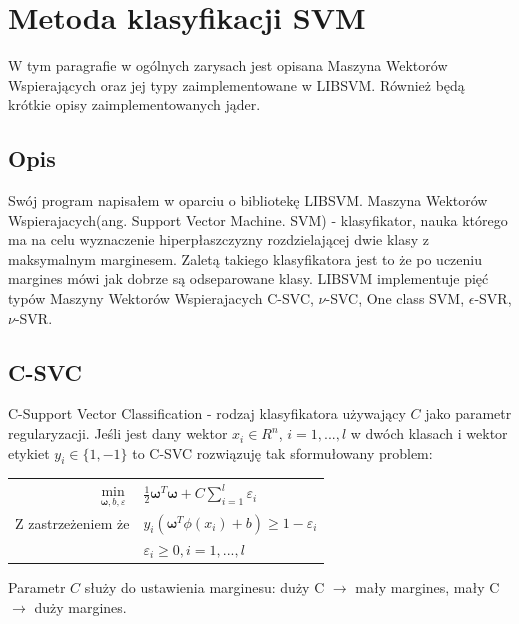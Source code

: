 \documentclass[paper=a4, fontsize=11pt]{scrartcl} %
\numberwithin{equation}{section} %
\numberwithin{figure}{section} %
\begin{document}
\section{Metoda klasyfikacji SVM} %
    \par W tym paragrafie w ogólnych zarysach jest opisana Maszyna Wektorów Wspierających
    oraz jej typy zaimplementowane w LIBSVM. Również będą krótkie opisy zaimplementowanych
    jąder.
\subsection{Opis}
    \par Swój program napisałem w oparciu o bibliotekę LIBSVM\cite{CC01a}. Maszyna Wektorów
    Wspierajacych(ang. Support Vector Machine. SVM) - klasyfikator, nauka którego ma na celu 
    wyznaczenie hiperpłaszczyzny rozdzielającej dwie klasy z maksymalnym marginesem. 
    Zaletą takiego klasyfikatora jest to że po uczeniu margines mówi jak dobrze są 
    odseparowane klasy. LIBSVM implementuje pięć typów Maszyny Wektorów Wspierajacych C-SVC, 
    $\nu$-SVC, One class SVM, $\epsilon$-SVR, $\nu$-SVR.
\subsection{C-SVC}
    \par C-Support Vector Classification - rodzaj klasyfikatora używający $C$ jako 
    parametr regularyzacji. Jeśli jest dany wektor $x_i \in R^n$, $i=1,...,l$ 
    w dwóch klasach i wektor etykiet $y_i \in \{1, -1\}$ to C-SVC rozwiązuję tak
    sformułowany problem:

    \begin{center}
        \begin{tabular}{rl}
            $\min\limits_{\pmb{\omega}, b, \varepsilon}$ & $\frac{1}{2} \pmb{\omega} ^T \pmb{\omega} +
            C \sum\limits_{i=1}^{l}\varepsilon_i$ \\
            Z zastrzeżeniem że & $y_i(\pmb{\omega}^T\phi(x_i) + b) \geq 1 - \varepsilon_i$ \\
                               & $\varepsilon_i \geq 0,i=1,...,l$
        \end{tabular}
    \end{center}

    \par Parametr $C$ służy do ustawienia marginesu: duży C $\rightarrow$ mały margines,
    mały C $\rightarrow$ duży margines.
\end{document}
